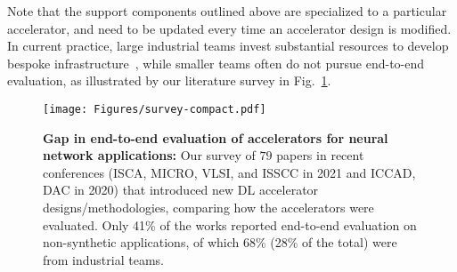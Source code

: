 Note that the support components outlined above are specialized to a particular accelerator, and need to be updated every time an accelerator design is modified.
In current practice, large industrial teams 
  invest substantial resources to develop bespoke infrastructure~\cite{jouppi2017datacenter, jouppi2020tpu},
  while smaller teams often
  do not pursue end-to-end evaluation,
  as illustrated by our literature survey in Fig.~\ref{fig.acc-survey}. %


\begin{figure}[!ht]
  \begin{minipage}[h]{0.52\textwidth}
    \vspace{-5\fboxsep}
    \caption{
    \textbf{Gap in end-to-end evaluation of accelerators for neural network applications:} Our survey of $79$ papers in recent conferences (ISCA, MICRO, VLSI, and ISSCC in 2021 and ICCAD, DAC in 2020) that introduced new DL accelerator designs/methodologies, comparing how the accelerators were evaluated. Only 41\% of the works reported end-to-end evaluation on non-synthetic applications, of which 68\% (28\% of the total) were from industrial teams.
    }
    \label{fig.acc-survey}
  \end{minipage}\hfill
  \begin{minipage}[h]{0.43\textwidth}
    \texttt{[image: Figures/survey-compact.pdf]}
  \end{minipage}
  \Description{}
\end{figure}


